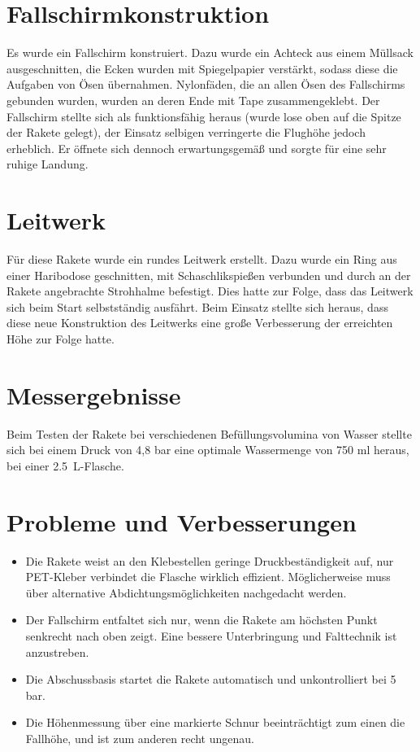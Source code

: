 \section{Fallschirmkonstruktion}
Es wurde ein Fallschirm konstruiert. Dazu wurde ein Achteck aus einem Müllsack ausgeschnitten, die Ecken wurden mit Spiegelpapier verstärkt, sodass diese die Aufgaben von Ösen übernahmen. Nylonfäden, die an allen Ösen des Fallschirms gebunden wurden, wurden an deren Ende mit Tape zusammengeklebt.
Der Fallschirm stellte sich als funktionsfähig heraus (wurde lose oben auf die Spitze der Rakete gelegt), der Einsatz selbigen verringerte die Flughöhe jedoch erheblich. Er öffnete sich dennoch erwartungsgemäß und sorgte für eine sehr ruhige Landung.

\section{Leitwerk}
Für diese Rakete wurde ein rundes Leitwerk erstellt. Dazu wurde ein Ring aus einer Haribodose geschnitten, mit Schaschlikspießen verbunden und durch an der Rakete angebrachte Strohhalme befestigt. Dies hatte zur Folge, dass das Leitwerk sich beim Start selbstständig ausfährt. Beim Einsatz stellte sich heraus, dass diese neue Konstruktion des Leitwerks eine große Verbesserung der erreichten Höhe zur Folge hatte.
\section{Messergebnisse}
Beim Testen der Rakete bei verschiedenen Befüllungsvolumina von Wasser stellte sich bei einem Druck von 4,8 bar eine optimale Wassermenge von 750 ml heraus, bei einer \SI{2.5}{\liter}-Flasche.

\section{Probleme und Verbesserungen}
\begin{itemize}
	\item Die Rakete weist an den Klebestellen geringe Druckbeständigkeit auf, nur PET-Kleber verbindet die Flasche wirklich effizient. Möglicherweise muss über alternative Abdichtungsmöglichkeiten nachgedacht werden.
	\item Der Fallschirm entfaltet sich nur, wenn die Rakete am höchsten Punkt senkrecht nach oben zeigt. Eine bessere Unterbringung und Falttechnik ist anzustreben.
	\item Die Abschussbasis startet die Rakete automatisch und unkontrolliert bei 5 bar.
	\item Die Höhenmessung über eine markierte Schnur beeinträchtigt zum einen die Fallhöhe, und ist zum anderen recht ungenau. 
\end{itemize}

